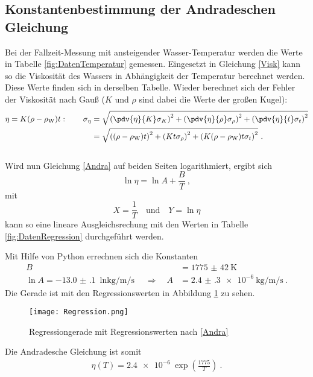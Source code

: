 \subsection{Konstantenbestimmung der Andradeschen Gleichung}
Bei der Fallzeit-Messung mit ansteigender Wasser-Temperatur werden die Werte in Tabelle \ref{fig:DatenTemperatur} gemessen. Eingesetzt in Gleichung \eqref{Visk} kann so die Viskosität des Wassers in Abhängigkeit der Temperatur berechnet werden. Diese Werte finden sich in derselben Tabelle. Wieder berechnet sich der Fehler der Viskosität nach Gauß ($K$ und $\rho$ sind dabei die Werte der großen Kugel):
\begin{align}
	\eta = K(\rho-\rho_\text{W})t: \qquad \sigma_{\eta} &= \sqrt{\left(\pdv{\eta}{K}\sigma_K\right)^2+\left(\pdv{\eta}{\rho}\sigma_{\rho}\right)^2 + \left(\pdv{\eta}{t}\sigma_{t}\right)^2} \\
	&= \sqrt{\left((\rho-\rho_\text{W})t\right)^2+\left(Kt\sigma_\rho\right)^2+\left(K(\rho-\rho_\text{W})t\sigma_t\right)^2} \ .
\end{align}
 \\
Wird nun Gleichung \eqref{Andra} auf beiden Seiten logarithmiert, ergibt sich
\[ \ln\eta = \ln A + \frac{B}{T} \ , \]
mit
\[ X = \frac{1}{T} \quad \text{und} \quad Y = \ln\eta \]
kann so eine lineare Ausgleichsrechung mit den Werten in Tabelle \ref{fig:DatenRegression} durchgeführt werden.

Mit Hilfe von Python errechnen sich die Konstanten
\begin{align}
	B &= \SI{1775(42)}{\kelvin} \\
	\ln A = \SI{-13.0(1)}{\ln\kilo\gram\per\metre\per\second} \quad \Rightarrow \quad A &= \SI{2.4(3)e-6}{\kilo\gram\per\metre\per\second} \ .
\end{align}
Die Gerade ist mit den Regressionswerten in Abbildung \ref{fig:Regression} zu sehen.
\begin{figure}[h!]
	\centering
	\texttt{[image: Regression.png]}
	\caption{Regressiongerade mit Regressionswerten nach \eqref{Andra}}
	\label{fig:Regression}
\end{figure}
Die Andradesche Gleichung ist somit
\begin{align}
	\eta(T) = \SI{2.4e-6}{}\exp\left(\frac{1775}{T}\right) \ .
\end{align}
\clearpage

